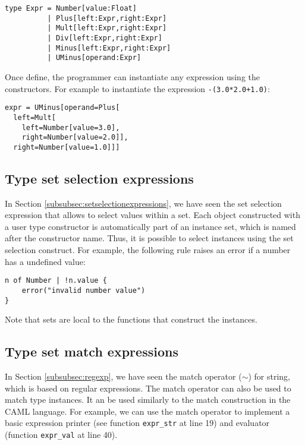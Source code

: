 \documentclass[11pt]{report}
\begin{document}
\begin{lstlisting}[numbers=none]
type Expr = Number[value:Float]
          | Plus[left:Expr,right:Expr]
          | Mult[left:Expr,right:Expr]
          | Div[left:Expr,right:Expr]
          | Minus[left:Expr,right:Expr]
          | UMinus[operand:Expr]
\end{lstlisting}

Once define, the programmer can instantiate any expression using the constructors. For example to instantiate the expression \texttt{-(3.0*2.0+1.0)}:

\begin{lstlisting}
expr = UMinus[operand=Plus[
  left=Mult[
    left=Number[value=3.0],
    right=Number[value=2.0]],
  right=Number[value=1.0]]]
\end{lstlisting}

\subsection{Type set selection expressions}

In Section \ref{subsubsec:setselectionexpressions}, we have seen the set selection expression that allows to select values within a set. Each object constructed with a user type constructor is automatically part of an instance set, which is named after the constructor name. Thus, it is possible to select instances using the set selection construct. For example, the following rule raises an error if a number has a undefined value:

\begin{lstlisting}[numbers=none]
n of Number | !n.value {
    error("invalid number value")
}
\end{lstlisting}

Note that sets are local to the functions that construct the instances.

\subsection{Type set match expressions}

In Section \ref{subsubsec:regexp}, we have seen the match operator ($\sim$) for string, which is based on regular expressions. The match operator can also be used to match type instances. It an be used similarly to the match construction in the CAML language. For example, we can use the match operator to implement a basic expression printer (see function \texttt{expr\_str} at line 19) and evaluator (function \texttt{expr\_val} at line 40).
\end{document}
